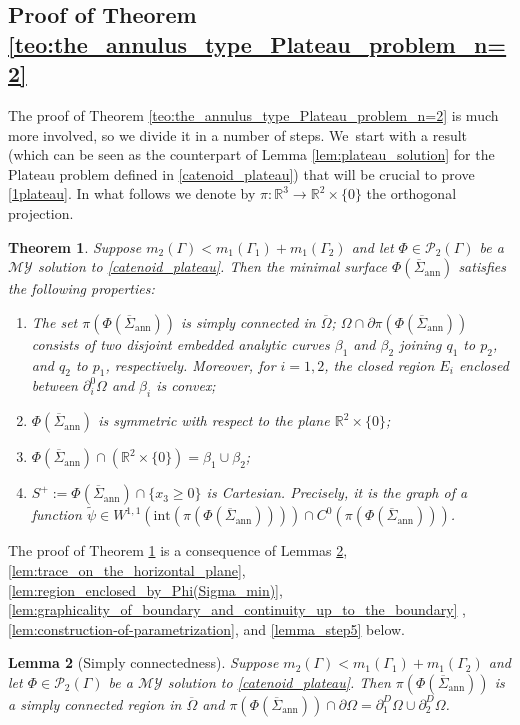 \documentclass[JEP,XML,SOM,Unicode, NoFloatCountersInSection,published]{cedram}
\newcommand{\R}{\mathbb{R}}
\let\Om\Omega
\newcommand{\immclosedann}{\Phi({\overline\Sigma}_\mathrm{ann})}
\newtheorem{theorem}{Theorem}[section]
\newtheorem{lemma}[theorem]{Lemma}
\theoremstyle{definition}
\begin{document}
\subsection{Proof of Theorem \ref{teo:the_annulus_type_Plateau_problem_n=2}}
The proof of
Theorem \ref{teo:the_annulus_type_Plateau_problem_n=2}
is much more involved, so we divide it in a number of steps. We~start with a result (which can be seen as the counterpart of
Lemma \ref{lem:plateau_solution} for the Plateau problem defined in \eqref{catenoid_plateau}) that will be crucial to prove \ref{1plateau}.
In what follows we denote by $\pi\colon\R^3\to\R^2\times\{0\}$ the orthogonal projection.
\begin{theorem}\label{crucial_teo}
Suppose $m_2(\Gamma)<m_1(\Gamma_1)+m_1(\Gamma_2)$ and let
$\Phi\in\mathcal{P}_2(\Gamma)$ be a $\mathcal{MY}$ solution to \eqref{catenoid_plateau}.
Then the minimal surface $\immclosedann$ satisfies the following properties:
\begin{enumerate}[label=$(\arabic*)$,wide]
\item \label{crucial1} The set $\pi(\immclosedann)$
is simply connected in $\overline\Omega$; $\Om\cap\partial \pi(\immclosedann)$
consists of two disjoint embedded analytic curves $\beta_1$ and $\beta_2$ joining $q_1$ to $p_2$, and $q_2$ to $p_1$, respectively.
Moreover, for
$i=1,2$,
the closed region $E_i$
enclosed between $\partial_i^0\Om$ and $\beta_i$
is convex;
\item\label{crucial2} $\immclosedann$ is symmetric with respect to the plane $\R^2\times\{0\}$;
\item\label{crucial3} $\immclosedann\cap(\R^2\times\{0\})=\beta_1\cup\beta_2$;
\item\label{crucial4} $S^+:=\immclosedann\cap \{x_3\ge0\}$ is Cartesian. Precisely, it is
the graph of a function $\widetilde\psi\in W^{1,1}(\mathrm{int}(\pi(\immclosedann)))\cap C^0({\pi(\immclosedann)})$.
\end{enumerate}
\end{theorem}
The proof of Theorem \ref{crucial_teo} is a consequence of Lemmas \ref{lem:simply_connectedness}, \ref{lem:trace_on_the_horizontal_plane}, \ref{lem:region_enclosed_by_Phi(Sigma_min)}, \ref{lem:graphicality_of_boundary_and_continuity_up_to_the_boundary} , \ref{lem:construction-of-parametrization}, and \ref{lemma_step5} below.
\begin{lemma}[Simply connectedness]
\label{lem:simply_connectedness}
Suppose $m_2(\Gamma)<m_1(\Gamma_1)+m_1(\Gamma_2)$ and let
$\Phi\in\mathcal{P}_2(\Gamma)$ be a $\mathcal{MY}$ solution to \eqref{catenoid_plateau}.
Then $\pi(\immclosedann)$ is a simply connected region in $\overline\Omega$ and { $\pi(\immclosedann)\cap\partial\Om=\partial_1^D\Om\cup\partial_2^D\Om$}.
\end{lemma}
\end{document}
